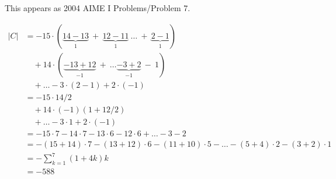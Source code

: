 This appears as 2004 AIME I Problems/Problem 7.

\begin{align*}
|C| 
& = 
- 15 \cdot (\underbrace{14 - 13}_{1} \ + \ \underbrace{12 - 11}_{1} \ \ldots \ + \ \underbrace{2 - 1}_{1})
\\&\quad 
+ 14 \cdot (\underbrace{-13 + 12}_{-1} \ + \ \ldots \underbrace{- 3 + 2}_{-1} \ - \ 1)
\\&\quad 
+ \ldots 
- 3 \cdot (2 - 1) 
+ 2 \cdot (-1)
\\[1ex]
& = 
- 15 \cdot 14/2
\\&\quad 
+ 14 \cdot (-1)(1+12/2)
\\&\quad 
+ \ldots
- 3 \cdot 1 
+ 2 \cdot (-1)
\\[1ex]
& = 
- 15 \cdot 7
- 14 \cdot 7
- 13 \cdot 6
- 12 \cdot 6
+ \ldots
- 3
- 2
\\[1ex]
& = 
- (15+14) \cdot 7
- (13+12) \cdot 6
- (11+10) \cdot 5
- \ldots
- (5+4) \cdot 2
- (3+2) \cdot 1
\\[1ex]
& =
-\sum_{k=1}^{7}(1+4k)k
\\[1ex]
& = 
- 588
\end{align*}

